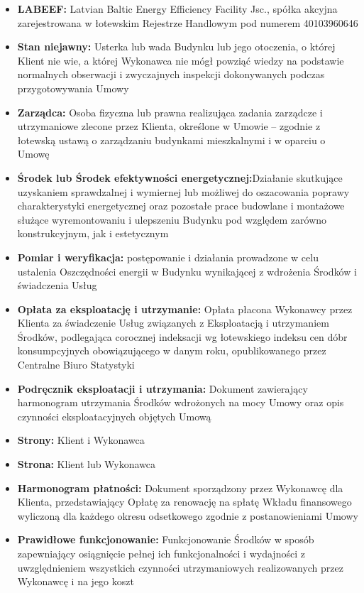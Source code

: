 \begin{multicols}{2}
\begin{itemize}[label={}]
	\item\textbf{LABEEF:} Latvian Baltic Energy Efficiency Facility Jsc., spółka akcyjna zarejestrowana w łotewskim Rejestrze Handlowym pod numerem 40103960646
	\item\textbf{Stan niejawny:} Usterka lub wada Budynku lub jego otoczenia, o której Klient nie wie, a której Wykonawca nie mógł powziąć wiedzy na podstawie normalnych obserwacji i zwyczajnych inspekcji dokonywanych podczas przygotowywania Umowy
	\item\textbf{Zarządca:} Osoba fizyczna lub prawna realizująca zadania zarządcze i utrzymaniowe zlecone przez Klienta, określone w Umowie – zgodnie z łotewską ustawą o zarządzaniu budynkami mieszkalnymi i w oparciu o Umowę
	\item\textbf{Środek lub Środek efektywności energetycznej:}Działanie skutkujące uzyskaniem sprawdzalnej i wymiernej lub możliwej do oszacowania poprawy charakterystyki energetycznej oraz pozostałe prace budowlane i montażowe służące wyremontowaniu i ulepszeniu Budynku pod względem zarówno konstrukcyjnym, jak i estetycznym
	\item\textbf{Pomiar i weryfikacja:} postępowanie i działania prowadzone w celu ustalenia Oszczędności energii w Budynku wynikającej z wdrożenia Środków i świadczenia Usług
	\item\textbf{Opłata za eksploatację i utrzymanie:} Opłata płacona Wykonawcy przez Klienta za świadczenie Usług związanych z Eksploatacją i utrzymaniem Środków, podlegająca corocznej indeksacji wg łotewskiego indeksu cen dóbr konsumpcyjnych obowiązującego w danym roku, opublikowanego przez Centralne Biuro Statystyki
	\item\textbf{Podręcznik eksploatacji i utrzymania:} Dokument zawierający harmonogram utrzymania Środków wdrożonych na mocy Umowy oraz opis czynności eksploatacyjnych objętych Umową
	\item\textbf{Strony:} Klient i Wykonawca
	\item\textbf{Strona:} Klient lub Wykonawca
	\item\textbf{Harmonogram płatności:} Dokument sporządzony przez Wykonawcę dla Klienta, przedstawiający Opłatę za renowację na spłatę Wkładu finansowego wyliczoną dla każdego okresu odsetkowego zgodnie z postanowieniami Umowy
	\item\textbf{Prawidłowe funkcjonowanie:} Funkcjonowanie Środków w sposób zapewniający osiągnięcie pełnej ich funkcjonalności i wydajności z uwzględnieniem wszystkich czynności utrzymaniowych realizowanych przez Wykonawcę i na jego koszt

\end{itemize}
\end{multicols}
